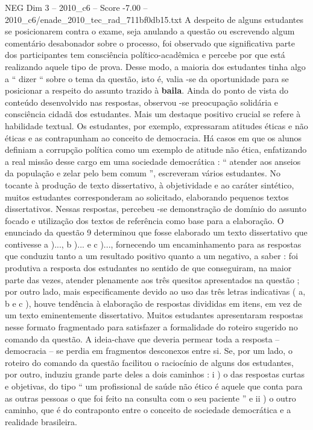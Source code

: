 \begin{textsample}{NEG Dim 3 – 2010\_c6 – Score -7.00 – 2010\_c6/enade\_2010\_tec\_rad\_711bf0db15.txt}
A despeito de alguns estudantes se posicionarem contra o exame, seja anulando a questão ou escrevendo algum comentário desabonador sobre o processo, foi observado que significativa parte dos participantes tem consciência político-acadêmica e percebe por que está realizando aquele tipo de prova.
Desse modo, a maioria dos estudantes tinha algo a “ dizer “ sobre o tema da questão, isto é, valia -se da oportunidade para se posicionar a respeito do assunto trazido à \textbf{baila}.
Ainda do ponto de vista do conteúdo desenvolvido nas respostas, observou -se preocupação solidária e consciência cidadã dos estudantes.
Mais um destaque positivo crucial se refere à habilidade textual.
Os estudantes, por exemplo, expressaram atitudes éticas e não éticas e as contrapunham ao conceito de democracia.
Há casos em que os alunos definiam a corrupção política como um exemplo de atitude não ética, enfatizando a real missão desse cargo em uma sociedade democrática : “ atender aos anseios da população e zelar pelo bem comum ”, escreveram vários estudantes.
No tocante à produção de texto dissertativo, à objetividade e ao caráter sintético, muitos estudantes corresponderam ao solicitado, elaborando pequenos textos dissertativos.
Nessas respostas, percebeu -se demonstração de domínio do assunto focado e utilização dos textos de referência como base para a elaboração.
O enunciado da questão 9 determinou que fosse elaborado um texto dissertativo que contivesse a )..., b )... e c )..., fornecendo um encaminhamento para as respostas que conduziu tanto a um resultado positivo quanto a um negativo, a saber : foi produtiva a resposta dos estudantes no sentido de que conseguiram, na maior parte das vezes, atender plenamente aos três quesitos apresentados na questão ; por outro lado, mais especificamente devido ao uso das três letras indicativas ( a, b e c ), houve tendência à elaboração de respostas divididas em itens, em vez de um texto eminentemente dissertativo.
Muitos estudantes apresentaram respostas nesse formato fragmentado para satisfazer a formalidade do roteiro sugerido no comando da questão.
A ideia-chave que deveria permear toda a resposta – democracia – se perdia em fragmentos desconexos entre si.
Se, por um lado, o roteiro do comando da questão facilitou o raciocínio de alguns dos estudantes, por outro, induziu grande parte deles a dois caminhos : i ) o das respostas curtas e objetivas, do tipo “ um profissional de saúde não ético é aquele que conta para as outras pessoas o que foi feito na consulta com o seu paciente ” e ii ) o outro caminho, que é do contraponto entre o conceito de sociedade democrática e a realidade brasileira.

\end{textsample}
